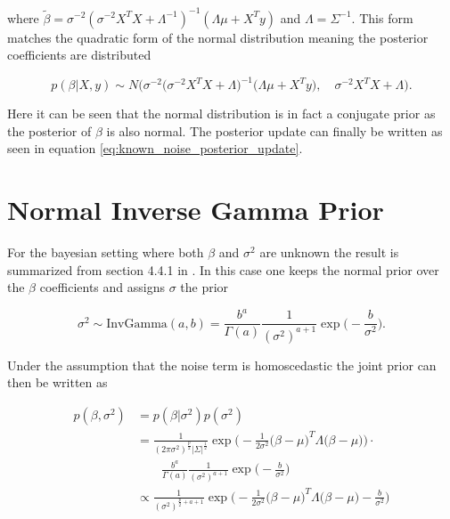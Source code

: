{where $\tilde{\beta} = \sigma^{-2}(\sigma^{-2}X^TX + \Lambda^{-1})^{-1}(\Lambda\mu + X^Ty)$ and $\Lambda = \Sigma^{-1}$. This form matches the quadratic form of the normal distribution meaning the posterior coefficients are distributed

\begin{equation}
    p(\beta |X,y) \sim N\bigg(\sigma^{-2}\big(\sigma^{-2}X^TX + \Lambda\big)^{-1}\big(\Lambda\mu + X^Ty\big), \quad \sigma^{-2}X^TX + \Lambda\bigg).
\end{equation}

Here it can be seen that the normal distribution is in fact a conjugate prior as the posterior of $\beta$ is also normal. The posterior update can finally be written as seen in equation \ref{eq:known_noise_posterior_update}.

\section{Normal Inverse Gamma Prior}{\label{a:bnig}

For the bayesian setting where both $\beta$ and $\sigma^2$ are unknown the result is summarized from section 4.4.1 in \cite{fahrmeir_2013}. In this case one keeps the normal prior over the $\beta$ coefficients and assigns $\sigma$ the prior

\begin{equation}
    \sigma^2 \sim \text{InvGamma}(a,b) = \frac{b^a}{\Gamma(a)}\frac{1}{(\sigma^2)^{a+1}}\exp\bigg(-\frac{b}{\sigma^2}\bigg).
\end{equation}

Under the assumption that the noise term is homoscedastic the joint prior can then be written as 

\begin{equation}
    \begin{split}
        p(\beta, \sigma^2) &= p(\beta|\sigma^2)p(\sigma^2)  \\
        &=\frac{1}{(2\pi\sigma^2)^\frac{p}{2}|\Sigma|^\frac{1}{2}}\exp\Big(-\frac{1}{2\sigma^2}\big(\beta-\mu\big)^T\Lambda\big(\beta-\mu\big)\Big)\cdot\\
        & \qquad \frac{b^a}{\Gamma(a)}\frac{1}{(\sigma^2)^{a+1}}\exp\Big(-\frac{b}{\sigma^2}\Big) \\
        &\propto \frac{1}{(\sigma^2)^{\frac{p}{2}+a+1}}\exp\Big(-\frac{1}{2\sigma^2}\big(\beta-\mu\big)^T\Lambda\big(\beta-\mu\big) - \frac{b}{\sigma^2}\Big)
    \end{split}
\end{equation}

}}
